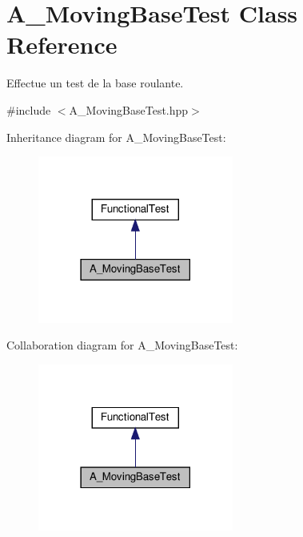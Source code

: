 \hypertarget{classA__MovingBaseTest}{}\section{A\+\_\+\+Moving\+Base\+Test Class Reference}
\label{classA__MovingBaseTest}


Effectue un test de la base roulante.  




{\ttfamily \#include $<$A\+\_\+\+Moving\+Base\+Test.\+hpp$>$}



Inheritance diagram for A\+\_\+\+Moving\+Base\+Test\+:
\nopagebreak
\begin{figure}[H]
\begin{center}
\leavevmode
\includegraphics[width=182pt]{classA__MovingBaseTest__inherit__graph}
\end{center}
\end{figure}


Collaboration diagram for A\+\_\+\+Moving\+Base\+Test\+:
\nopagebreak
\begin{figure}[H]
\begin{center}
\leavevmode
\includegraphics[width=182pt]{classA__MovingBaseTest__coll__graph}
\end{center}
\end{figure}
